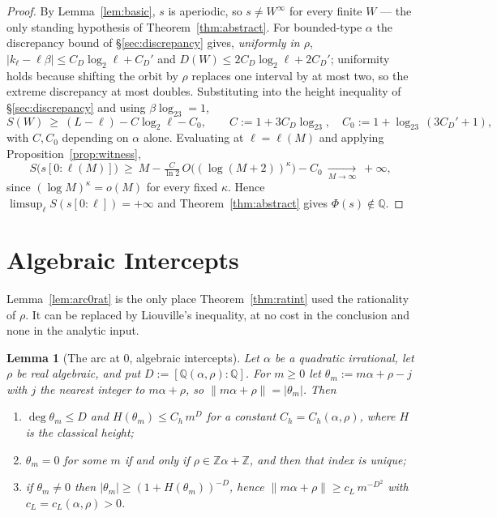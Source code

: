 \documentclass[11pt]{article}
\newtheorem{lemma}[theorem]{Lemma}
\newcommand{\Q}{\mathbb{Q}}
\newcommand{\Z}{\mathbb{Z}}
\begin{document}
\begin{proof}
By Lemma~\ref{lem:basic}, $s$ is aperiodic, so $s\ne W^\infty$ for every finite $W$ --- the only
standing hypothesis of Theorem~\ref{thm:abstract}. For bounded-type $\alpha$ the discrepancy bound of
\S\ref{sec:discrepancy} gives, \emph{uniformly in $\rho$},
$|k_\ell-\ell\beta|\le C_D\log_2\ell+C_D'$ and
$D(W)\le2C_D\log_2\ell+2C_D'$; uniformity holds because shifting the orbit by $\rho$ replaces one
interval by at most two, so the extreme discrepancy at most doubles. Substituting into the height
inequality of \S\ref{sec:discrepancy} and using $\beta\log_23=1$,
\[
  S(W)\ \ge\ (L-\ell)-C\log_2\ell-C_0,\qquad
  C:=1+3C_D\log_23,\quad C_0:=1+\log_23\,(3C_D'+1),
\]
with $C,C_0$ depending on $\alpha$ alone. Evaluating at $\ell=\ell(M)$ and applying
Proposition~\ref{prop:witness},
\[
  S\bigl(s[0{:}\ell(M)]\bigr)\ \ge\ M-\tfrac{C}{\ln2}\,O\bigl((\log(M+2))^\kappa\bigr)-C_0
  \ \xrightarrow[M\to\infty]{}\ +\infty,
\]
since $(\log M)^\kappa=o(M)$ for every fixed $\kappa$. Hence $\limsup_\ell S(s[0{:}\ell])=+\infty$
and Theorem~\ref{thm:abstract} gives $\Phi(s)\notin\Q$.
\end{proof}

\section{Algebraic Intercepts}
\label{sec:algint}

Lemma~\ref{lem:arc0rat} is the only place Theorem~\ref{thm:ratint} used the rationality of $\rho$.
It can be replaced by Liouville's inequality, at no cost in the conclusion and none in the analytic
input.

\begin{lemma}[The arc at $0$, algebraic intercepts]
\label{lem:arc0alg}
Let $\alpha$ be a quadratic irrational, let $\rho$ be real algebraic, and put
$D:=[\Q(\alpha,\rho):\Q]$. For $m\ge0$ let $\theta_m:=m\alpha+\rho-j$ with $j$ the nearest integer to
$m\alpha+\rho$, so $\lVert m\alpha+\rho\rVert=|\theta_m|$. Then
\begin{enumerate}[label=(\roman*),leftmargin=2.2em]
\item $\deg\theta_m\le D$ and $H(\theta_m)\le C_h\,m^{D}$ for a constant $C_h=C_h(\alpha,\rho)$,
      where $H$ is the classical height;
\item $\theta_m=0$ for some $m$ if and only if $\rho\in\Z\alpha+\Z$, and then that index is unique;
\item if $\theta_m\ne0$ then $|\theta_m|\ge(1+H(\theta_m))^{-D}$, hence
      $\lVert m\alpha+\rho\rVert\ge c_L\,m^{-D^2}$ with $c_L=c_L(\alpha,\rho)>0$.
\end{enumerate}
\end{lemma}
\end{document}
